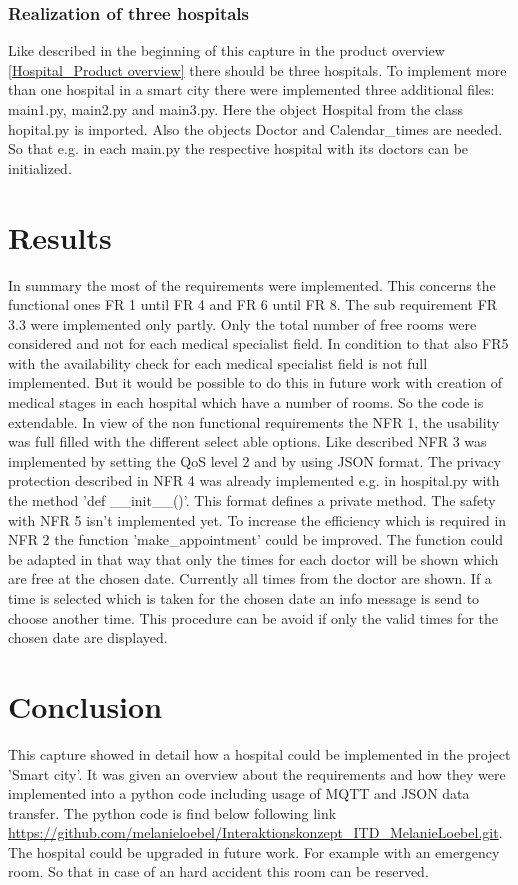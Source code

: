 \subsubsection{Realization of three hospitals}
Like described in the beginning of this capture in the product overview \ref{Hospital_Product overview} there should be three hospitals. To implement more than one hospital in a smart city there were implemented three additional files: main1.py, main2.py and main3.py.
Here the object Hospital from the class hopital.py is imported. Also the objects Doctor and Calendar_times are needed. So that e.g. in each main.py the respective hospital with its doctors can be initialized.

\section{Results}
\label{sec:5}
In summary the most of the requirements were implemented. This concerns the functional ones FR 1 until FR 4 and FR 6 until FR 8. The sub requirement FR 3.3 were implemented only partly. Only the total number of free rooms were considered and not for each medical specialist field. In condition to that also FR5 with the availability check for each medical specialist field is not full implemented.  But it would be possible to do this in future work with creation of medical stages in each hospital which have a number of rooms. So the code is extendable. In view of the non functional requirements the NFR 1, the usability was full filled with the different select able options. Like described NFR 3 was implemented by setting the QoS level 2 and by using JSON format. The privacy protection described in NFR 4 was already implemented e.g. in hospital.py with the method 'def __init__()'. This format defines a private method. The safety with NFR 5 isn't implemented yet. To increase the efficiency which is required in NFR 2 the function 'make_appointment' could be improved. The function could be adapted in that way that only the times for each doctor will be shown which are free at the chosen date. Currently all times from the doctor are shown. If a time is selected which is taken for the chosen date an info message is send to choose another time. This procedure can be avoid if only the valid times for the chosen date are displayed.
\\

\section{Conclusion}
\label{sec:5}
This capture showed in detail how a hospital could be implemented in the project 'Smart city'. It was given an overview about the requirements and how they were implemented into a python code including usage of MQTT and JSON data transfer. The python code is find below following link \url{https://github.com/melanieloebel/Interaktionskonzept_ITD_MelanieLoebel.git}. The hospital could be upgraded in future work. For example with an emergency room. So that in case of an hard accident this room can be reserved.

\newpage


